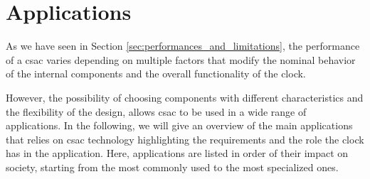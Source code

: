 \section{Applications}
\label{sec:applications}

As we have seen in Section \ref{sec:performances_and_limitations}, the performance of a \acrshort{csac} varies depending on multiple factors that modify the nominal behavior of the internal components and the overall functionality of the clock.

However, the possibility of choosing components with different characteristics and the flexibility of the design, allows \acrshort{csac} to be used in a wide range of applications.
In the following, we will give an overview of the main applications that relies on \acrshort{csac} technology highlighting the requirements and the role the clock has in the application.
Here, applications are listed in order of their impact on society, starting from the most commonly used to the most specialized ones.





